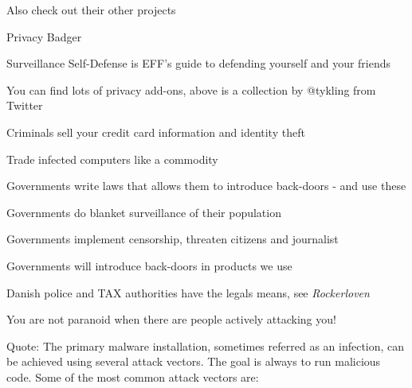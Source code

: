 \documentclass[20pt,landscape,a4paper,footrule]{foils}
\begin{document}
\begin{list2}
\item Also check out their other projects
\item Privacy Badger 
\item Surveillance Self-Defense is EFF's guide to defending yourself and your friends\\
\end{list2}



You can find lots of privacy add-ons, above is a collection by @tykling from Twitter
{\tiny
{}\\
}




\begin{list2}
\item Criminals sell your credit card information and identity theft
\item Trade infected computers like a commodity
\item Governments write laws that allows them to introduce back-doors - and use these
\item Governments do blanket surveillance of their population
\item Governments implement censorship, threaten citizens and journalist
\item Governments will introduce back-doors in products we use
\item Danish police and TAX authorities have the legals means, see \emph{Rockerloven}
\end{list2}

\vskip 1cm
\centerline{You are not paranoid when there are people actively attacking you!}



Quote:
The primary malware installation, sometimes referred as an infection, can be achieved using several attack vectors.
The goal is always to run malicious code. Some of the most common attack vectors are:
\end{document}
